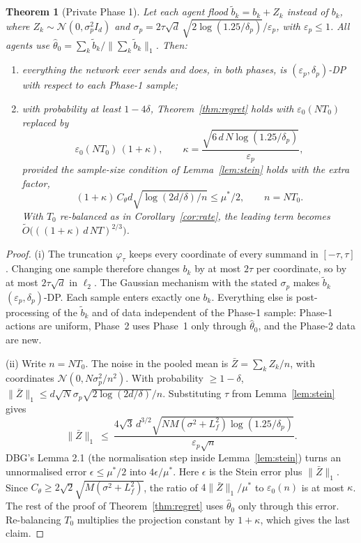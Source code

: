 \documentclass[11pt]{article}
\newtheorem{theorem}{Theorem}
\theoremstyle{definition}
\newcommand{\eps}{\varepsilon}
\begin{document}
\begin{theorem}[Private Phase 1]\label{thm:private}
Let each agent flood $\tilde b_k=b_k+Z_k$ instead of $b_k$, where $Z_k\sim\mathcal N(0,\sigma_p^2I_d)$ and
$\sigma_p=2\tau\sqrt d\,\sqrt{2\log(1.25/\delta_p)}/\varepsilon_p$, with $\varepsilon_p\le1$. All agents use
$\hat\theta_0=\sum_k\tilde b_k/\|\sum_k\tilde b_k\|_1$. Then:
\begin{enumerate}[nosep,label=(\roman*)]
\item everything the network ever sends and does, in both phases, is $(\varepsilon_p,\delta_p)$-DP with respect to
each Phase-1 sample;
\item with probability at least $1-4\delta$, Theorem~\ref{thm:regret} holds with $\eps_0(NT_0)$ replaced by
\[
\eps_0(NT_0)\,(1+\kappa),\qquad \kappa=\frac{\sqrt{6\,d\,N\log(1.25/\delta_p)}}{\varepsilon_p},
\]
provided the sample-size condition of Lemma~\ref{lem:stein} holds with the extra factor,
\[
(1+\kappa)\,C_\theta d\sqrt{\log(2d/\delta)/n}\le\mu^*/2,\qquad n=NT_0.
\]
With $T_0$ re-balanced as in Corollary~\ref{cor:rate}, the leading term becomes
$\tilde O\big(((1+\kappa)\,d\,NT)^{2/3}\big)$.
\end{enumerate}
\end{theorem}
\begin{proof}
(i) The truncation $\varphi_\tau$ keeps every coordinate of every summand in $[-\tau,\tau]$. Changing one sample therefore
changes $b_k$ by at most $2\tau$ per coordinate, so by at most $2\tau\sqrt d$ in $\ell_2$. The Gaussian mechanism with the
stated $\sigma_p$ makes $\tilde b_k$ $(\varepsilon_p,\delta_p)$-DP. Each sample enters exactly one $b_k$. Everything else is
post-processing of the $\tilde b_k$ and of data independent of the Phase-1 sample: Phase-1 actions are uniform, Phase~2
uses Phase~1 only through $\hat\theta_0$, and the Phase-2 data are new.

(ii) Write $n=NT_0$. The noise in the pooled mean is $\bar Z=\sum_kZ_k/n$, with coordinates $\mathcal N(0,N\sigma_p^2/n^2)$. With
probability $\ge1-\delta$, $\|\bar Z\|_1\le d\sqrt N\sigma_p\sqrt{2\log(2d/\delta)}/n$. Substituting $\tau$ from
Lemma~\ref{lem:stein} gives
\[
\|\bar Z\|_1\ \le\ \frac{4\sqrt3\,d^{3/2}\sqrt{N M(\sigma^2+L_f^2)\log(1.25/\delta_p)}}{\varepsilon_p\sqrt n}.
\]
DBG's Lemma 2.1 (the normalisation step inside Lemma~\ref{lem:stein}) turns an unnormalised error $\epsilon\le\mu^*/2$ into
$4\epsilon/\mu^*$. Here $\epsilon$ is the Stein error plus $\|\bar Z\|_1$. Since $C_\theta\ge2\sqrt2\sqrt{M(\sigma^2+L_f^2)}$, the
ratio of $4\|\bar Z\|_1/\mu^*$ to $\eps_0(n)$ is at most $\kappa$. The rest of the proof of Theorem~\ref{thm:regret}
uses $\hat\theta_0$ only through this error. Re-balancing $T_0$ multiplies the projection constant by $1+\kappa$, which
gives the last claim.
\end{proof}
\end{document}
